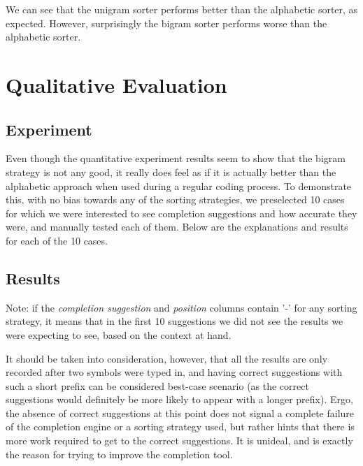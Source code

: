 
We can see that the unigram sorter performs better than the alphabetic sorter, as expected. However, surprisingly the bigram sorter performs worse than the alphabetic sorter.  

\section{Qualitative Evaluation}
\label{sec:Evaluation-Qualitative}
\subsection{Experiment}
Even though the quantitative experiment results seem to show that the bigram strategy is not any good, it really does feel as if it is actually better than the alphabetic approach when used during a regular coding process. To demonstrate this, with no bias towards any of the sorting strategies, we preselected 10 cases for which we were interested to see completion suggestions and how accurate they were, and manually tested each of them. Below are the explanations and results for each of the 10 cases.

\subsection{Results}
Note: if the \textit{completion suggestion} and \textit{position} columns contain '-' for any sorting strategy, it means that in the first 10 suggestions we did not see the results we were expecting to see, based on the context at hand.

It should be taken into consideration, however, that all the results are only recorded after two symbols were typed in, and having correct suggestions with such a short prefix can be considered best-case scenario (as the correct suggestions would definitely be more likely to appear with a longer prefix). Ergo, the absence of correct suggestions at this point does not signal a complete failure of the completion engine or a sorting strategy used, but rather hints that there is more work required to get to the correct suggestions. It is unideal, and is exactly the reason for trying to improve the completion tool.

